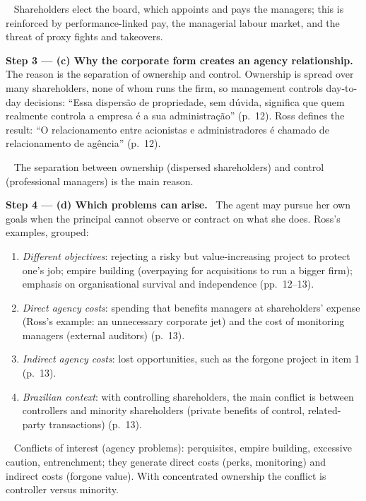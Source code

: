 \documentclass[11pt,a4paper]{article}
\newcommand{\step}[2]{\par\medskip\noindent\textbf{Step #1 --- #2.}~}
\newcommand{\pt}{\foreignlanguage{brazilian}}
\newcommand{\answer}[1]{\par\smallskip\noindent\fbox{\textbf{Answer #1.}}~}
\begin{document}
\answer{(b)} Shareholders elect the board, which appoints and pays the managers; this is
reinforced by performance-linked pay, the managerial labour market, and the threat of proxy
fights and takeovers.

\step{3}{(c) Why the corporate form creates an agency relationship} The reason is the
separation of ownership and control. Ownership is spread over many shareholders, none of whom
runs the firm, so management controls day-to-day decisions: \pt{``Essa dispers\~ao de
propriedade, sem d\'uvida, significa que quem realmente controla a empresa \'e a sua
administra\c{c}\~ao''} (p.~12). Ross defines the result: \pt{``O relacionamento entre
acionistas e administradores \'e chamado de relacionamento de ag\^encia''} (p.~12).

\answer{(c)} The separation between ownership (dispersed shareholders) and control
(professional managers) is the main reason.

\step{4}{(d) Which problems can arise} The agent may pursue her own goals when the principal
cannot observe or contract on what she does. Ross's examples, grouped:
\begin{enumerate}
  \item \emph{Different objectives}: rejecting a risky but value-increasing project to protect
        one's job; empire building (overpaying for acquisitions to run a bigger firm);
        emphasis on organisational survival and independence (pp.~12--13).
  \item \emph{Direct agency costs}: spending that benefits managers at shareholders' expense
        (Ross's example: an unnecessary corporate jet) and the cost of monitoring managers
        (external auditors) (p.~13).
  \item \emph{Indirect agency costs}: lost opportunities, such as the forgone project in item 1
        (p.~13).
  \item \emph{Brazilian context}: with controlling shareholders, the main conflict is between
        controllers and minority shareholders (private benefits of control, related-party
        transactions) (p.~13).
\end{enumerate}

\answer{(d)} Conflicts of interest (agency problems): perquisites, empire building,
excessive caution, entrenchment; they generate direct costs (perks, monitoring) and indirect
costs (forgone value). With concentrated ownership the conflict is controller versus minority.
\end{document}

